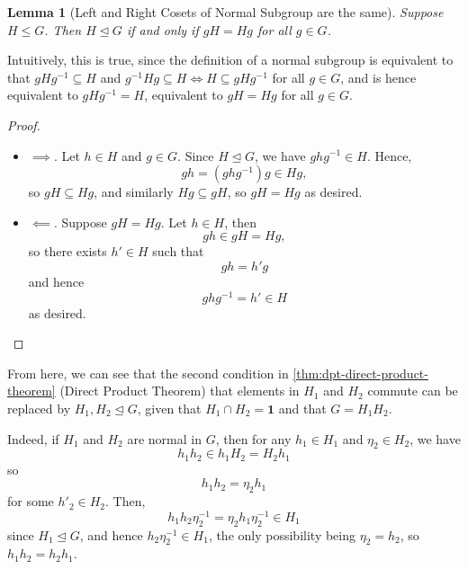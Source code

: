 \documentclass{article}
\newtheorem{lemma}[theorem]{Lemma}
\theoremstyle{definition}
\theoremstyle{remark}
\newcommand{\pqty}[1]{\left(#1\right)}
\newcommand{\inverse}{^{-1}}
\newcommand{\normalsub}{\trianglelefteq}
\newcommand{\subgroup}{\leq}
\newcommand{\trivialgp}{\mathbf{1}}
\begin{document}
\begin{lemma}[Left and Right Cosets of Normal Subgroup are the same]
    \label{lem:left-right-coset-normal}%
    Suppose \(H \subgroup G\). Then \(H \normalsub G\) if and only if \(gH = Hg\) for all \(g \in G\).
\end{lemma}

Intuitively, this is true, since the definition of a normal subgroup is equivalent to that \(gHg\inverse \subseteq H\) and \(g\inverse H g \subseteq H \iff H \subseteq g H g\inverse\) for all \(g \in G\), and is hence equivalent to \(gHg\inverse = H\), equivalent to \(gH = Hg\) for all \(g \in G\).

\begin{proof}
    \begin{itemize}
        \item \(\implies\). Let \(h \in H\) and \(g \in G\). Since \(H\normalsub G\), we have \(g h g\inverse \in H\). Hence,
        \[
            gh = \pqty{ghg\inverse} g \in Hg,
        \]
        so \(gH \subseteq Hg\), and similarly \(Hg \subseteq gH\), so \(gH = Hg\) as desired.
        \item \(\impliedby\). Suppose \(gH = Hg\). Let \(h \in H\), then
        \[
            gh \in gH = Hg,
        \]
        so there exists \(h' \in H\) such that
        \[
            gh = h' g
        \]
        and hence
        \[
            ghg\inverse = h' \in H
        \]
        as desired.
    \end{itemize}
\end{proof}

From here, we can see that the second condition in \autoref{thm:dpt-direct-product-theorem} (Direct Product Theorem) that elements in \(H_1\) and \(H_2\) commute can be replaced by \(H_1, H_2 \normalsub G\), given that \(H_1 \cap H_2 = \trivialgp\) and that \(G = H_1 H_2\).

Indeed, if \(H_1\) and \(H_2\) are normal in \(G\), then for any \(h_1 \in H_1\) and \(\eta_2 \in H_2\), we have
\[
    h_1 h_2 \in h_1 H_2 = H_2 h_1
\]
so
\[
    h_1 h_2 = \eta_2 h_1
\]
for some \(h'_2 \in H_2\). Then,
\[
    h_1 h_2 \eta_2\inverse = \eta_2 h_1 \eta_2\inverse \in H_1
\]
since \(H_1 \normalsub G\), and hence \(h_2 \eta_2\inverse \in H_1\), the only possibility being \(\eta_2 = h_2\), so \(h_1 h_2 = h_2 h_1\).
\end{document}
